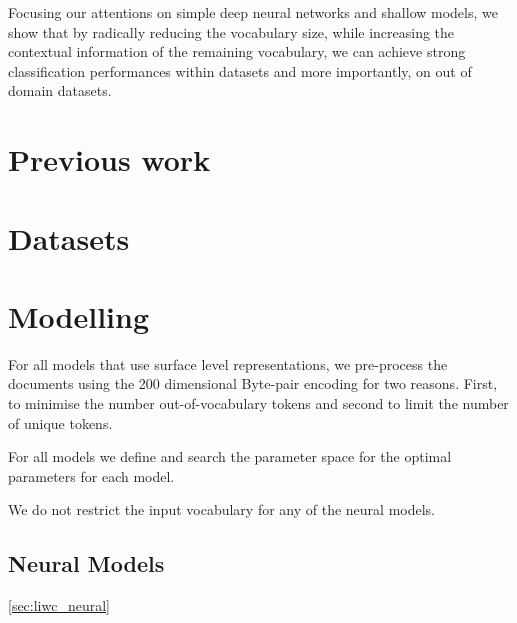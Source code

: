 Focusing our attentions on simple deep neural networks and shallow models, we show that by radically reducing the vocabulary size, while increasing the contextual information of the remaining vocabulary, we can achieve strong classification performances within datasets and more importantly, on out of domain datasets.

\section{Previous work}


\section{Datasets}


\section{Modelling}

For all models that use surface level representations, we pre-process the documents using the 200 dimensional Byte-pair encoding \cite{CITE: BPE paper} for two reasons. First, to minimise the number out-of-vocabulary tokens and second to limit the number of unique tokens. 

For all models we define and search the parameter space for the optimal parameters for each model.

We do not restrict the input vocabulary for any of the neural models.

\subsection{Neural Models}\ref{sec:liwc_neural}

